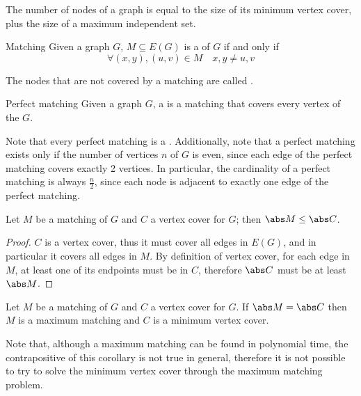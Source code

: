 \documentclass[a4paper, 12pt]{report}
\begin{document}
    \begin{framedcor}{}
        The number of nodes of a graph is equal to the size of its minimum vertex cover, plus the size of a maximum independent set.
    \end{framedcor}

    \begin{frameddefn}{Matching}
        Given a graph $G$, $M \subseteq E(G)$ is a  of $G$ if and only if $$\forall (x, y), (u, v) \in M \quad x , y\neq u,v$$
    \end{frameddefn}

    The nodes that are not covered by a matching are called .

    \begin{frameddefn}{Perfect matching}
        Given a graph $G$, a  is a matching that covers every vertex of the $G$.
    \end{frameddefn}

    Note that every perfect matching is a . Additionally, note that a perfect matching exists only if the number of vertices $n$ of $G$ is even, since each edge of the perfect matching covers exactly 2 vertices. In particular, the cardinality of a perfect matching is always $\frac{n}{2}$, since each node is adjacent to exactly one edge of the perfect matching.

    \begin{framedthm}[label={bounded_matching}]{}
        Let $M$ be a matching of $G$ and $C$ a vertex cover for $G$; then $\abs M \le \abs C$.
    \end{framedthm}

    \begin{proof}
        $C$ is a vertex cover, thus it must cover all edges in $E(G)$, and in particular it covers all edges in $M$. By definition of vertex cover, for each edge in $M$, at least one of its endpoints must be in $C$, therefore $\abs C$ must be at least $\abs M$.
    \end{proof}

    \begin{framedcor}{}
        Let $M$ be a matching of $G$ and $C$ a vertex cover for $G$. If $\abs M = \abs C$ then $M$ is a maximum matching and $C$ is a minimum vertex cover.
    \end{framedcor}

    Note that, although a maximum matching can be found in polynomial time, the contrapositive of this corollary is not true in general, therefore it is not possible to try to solve the minimum vertex cover through the maximum matching problem.
\end{document}
